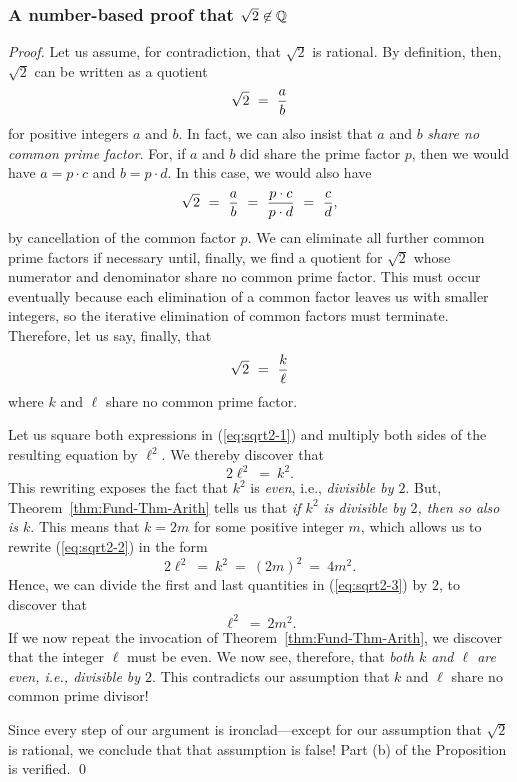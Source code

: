 \subsubsection{A number-based proof that $\sqrt{2} \not\in \mathbb{Q}$}
\label{sec:classical-proof-sqrt(2)}

\begin{proof}
Let us assume, for contradiction, that $\sqrt{2}$ is rational.  By definition, then, $\sqrt{2}$ can be written as a quotient
\[ \sqrt{2} \ = \ {a \over b} \]
for positive integers $a$ and $b$.  In fact, we can also insist that $a$ and $b$ {\em share no common prime factor}.  For, if $a$ and $b$ did share the prime factor $p$, then we would have $a = p \cdot c$ and $b = p \cdot d$.  In this case, we would also have
\[ \sqrt{2} \ = \ {a \over b} \ = \ \frac{p \cdot c}{p \cdot d}
\ = \ {c \over d},
\]
by cancellation of the common factor $p$.  We can eliminate all further common prime factors if necessary until, finally, we find a quotient for $\sqrt{2}$ whose numerator and denominator share no common prime factor.  This must occur eventually because each elimination of a common factor leaves us with smaller integers, so the iterative elimination of common factors must terminate.  Therefore, let us say, finally, that
\begin{equation}
\label{eq:sqrt2-1}
\sqrt{2} \ = \ {k \over \ell}
\end{equation}
where $k$ and $\ell$ share no common prime factor.

\smallskip

Let us square both expressions in (\ref{eq:sqrt2-1}) and multiply both sides of the resulting equation by $\ell^2$.  We thereby discover that
\begin{equation}
\label{eq:sqrt2-2}
2 \ell^2 \ = \ k^2.
\end{equation}
This rewriting exposes the fact that $k^2$ is {\em even}, i.e., {\em divisible by $2$}.  But, Theorem~\ref{thm:Fund-Thm-Arith} tells us that {\em if $k^2$ is divisible by $2$, then so also is $k$}.  This means that $k = 2m$ for some positive integer $m$, which allows us to rewrite (\ref{eq:sqrt2-2}) in the form
\begin{equation}
\label{eq:sqrt2-3}
2 \ell^2 \ = \ k^2 \ = \ (2m)^2 \ = \ 4m^2.
\end{equation}
Hence, we can divide the first and last quantities in (\ref{eq:sqrt2-3}) by $2$, to discover that
\[ \ell^2 \ = \ 2m^2. \]
If we now repeat the invocation of Theorem~\ref{thm:Fund-Thm-Arith}, we discover that the integer $\ell$ must be even.  We now see, therefore, that {\em both $k$ and $\ell$ are even, i.e., divisible by $2$}.  This contradicts our assumption that $k$ and $\ell$ share no common prime divisor!

Since every step of our argument is ironclad---except for our assumption that $\sqrt{2}$ is rational, we conclude that that assumption is false!  Part (b) of the Proposition is verified. \qed
\end{proof}

